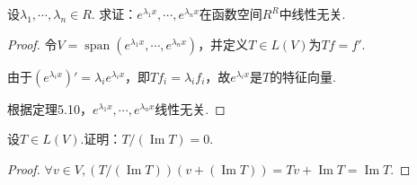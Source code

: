 \begin{comment}
    \begin{problem}[31]\label{5.A.31}
        设\(V\)是有限维向量空间且\(v_1,\cdots,v_m \in V\).

        求证：\(v_1,\cdots,v_m\)线性无关等价于\(v_1,\cdots,v_m\)是某\(T \in L(V)\)对应不同特征值的特征向量.
    \end{problem}

    \begin{proof}
        必要性：根据定理5.10证毕.

        充分性：由于\(v_1,\cdots,v_m\)线性无关，可以令\(v_1,\cdots,v_m,v_{m+1},\cdots,v_n\)为\(V\)的一组基.
        
        定义\(Tv_i=iv_i,1=1,\cdots,n\)即可.
    \end{proof}
\end{comment}

\begin{problem}[32]\label{5.A.32}
    设\(\lambda_1,\cdots,\lambda_n \in R\).
    求证：\(e^{\lambda_1 x},\cdots,e^{\lambda_n x}\)在函数空间\(R^R\)中线性无关.
\end{problem}

\begin{proof}
    令\(V=\operatorname{span} (e^{\lambda_1 x},\cdots,e^{\lambda_n x})\)，并定义\(T \in L(V)\)为\(Tf=f'\).

    由于\((e^{\lambda_i x})'=\lambda_i e^{\lambda_i x}\)，即\(Tf_i=\lambda_i f_i\)，故\(e^{\lambda_i x}\)是\(T\)的特征向量.
    
    根据定理5.10，\(e^{\lambda_1 x},\cdots,e^{\lambda_n x}\)线性无关.
\end{proof}

\begin{problem}[33]\label{5.A.33}
    设\(T \in L(V)\).证明：\(T/(\operatorname{Im} T)=0\).
\end{problem}

\begin{proof}
    \(\forall v \in V,(T/(\operatorname{Im} T))(v+(\operatorname{Im} T))=Tv+\operatorname{Im} T=\operatorname{Im} T\).
\end{proof}

